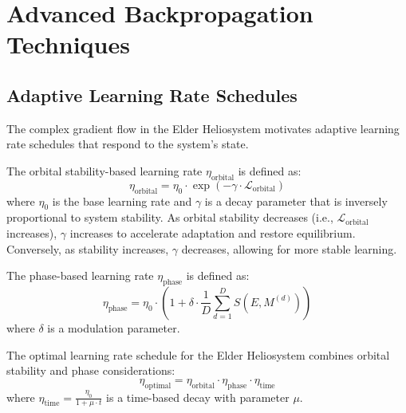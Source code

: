 \section{Advanced Backpropagation Techniques}

\subsection{Adaptive Learning Rate Schedules}

The complex gradient flow in the Elder Heliosystem motivates adaptive learning rate schedules that respond to the system's state.

\begin{definition}
The orbital stability-based learning rate $\eta_{\text{orbital}}$ is defined as:
\begin{equation}
\eta_{\text{orbital}} = \eta_0 \cdot \exp\left(-\gamma \cdot \mathcal{L}_{\text{orbital}}\right)
\end{equation}
where $\eta_0$ is the base learning rate and $\gamma$ is a decay parameter that is inversely proportional to system stability. As orbital stability decreases (i.e., $\mathcal{L}_{\text{orbital}}$ increases), $\gamma$ increases to accelerate adaptation and restore equilibrium. Conversely, as stability increases, $\gamma$ decreases, allowing for more stable learning.
\end{definition}

\begin{definition}
The phase-based learning rate $\eta_{\text{phase}}$ is defined as:
\begin{equation}
\eta_{\text{phase}} = \eta_0 \cdot \left(1 + \delta \cdot \frac{1}{D} \sum_{d=1}^D S(E, M^{(d)})\right)
\end{equation}
where $\delta$ is a modulation parameter.
\end{definition}

\begin{theorem}
The optimal learning rate schedule for the Elder Heliosystem combines orbital stability and phase considerations:
\begin{equation}
\eta_{\text{optimal}} = \eta_{\text{orbital}} \cdot \eta_{\text{phase}} \cdot \eta_{\text{time}}
\end{equation}
where $\eta_{\text{time}} = \frac{\eta_0}{1 + \mu \cdot t}$ is a time-based decay with parameter $\mu$.
\end{theorem}

